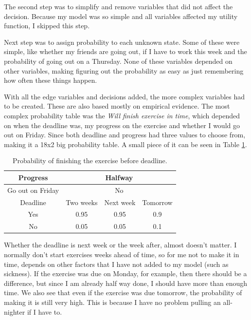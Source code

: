 \documentclass{article}
\begin{document}
    The second step was to simplify and remove variables that did not affect the
    decision. Because my model was so simple and all variables affected my
    utility function, I skipped this step.

    Next step was to assign probability to each unknown state. Some of these
    were simple, like whether my friends are going out, if I have to
    work this week and the probability of going out on a Thursday. None of
    these variables depended on other variables, making figuring out the
    probability as easy as just remembering how often these things happen.

    With all the edge variables and decisions added, the more complex variables
    had to be created. These are also based mostly on empirical evidence. The
    most complex probability table was the \emph{Will finish exercise in time},
    which depended on when the deadline was, my progress on the exercise and
    whether I would go out on Friday. Since both deadline and progress had
    three values to choose from, making it a 18x2 big probability table. A
    small piece of it can be seen in Table \ref{tab:prob}.

    \begin{table}[ht]
        \centering
        \begin{tabular}{| c | c | c | c |}\hline
            Progress & \multicolumn{3}{|c|}{Halfway}\\ \hline

            Go out on Friday & \multicolumn{3}{|c|}{No} \\ \hline

            Deadline & Two weeks & Next week & Tomorrow\\ \hline

            Yes & 0.95 & 0.95 & 0.9\\ \hline

            No & 0.05 & 0.05 & 0.1\\ \hline
        \end{tabular}
        \caption{Probability of finishing the exercise before deadline.}
        \label{tab:prob}
    \end{table}

    Whether the deadline is next week or the week after, almost doesn't matter.
    I normally don't start exercises weeks ahead of time, so for me not to make
    it in time, depends on other factors that I have not added to my model
    (such as sickness). If the exercise was due on Monday, for example, then
    there should be a difference, but since I am already half way done, I
    should have more than enough time. We also see that even if the exercise
    was due tomorrow, the probability of making it is still very high. This is
    because I have no problem pulling an all-nighter if I have to. 
\end{document}

